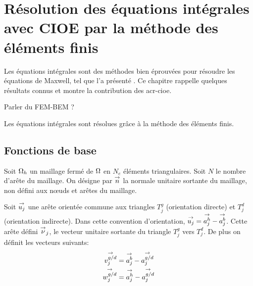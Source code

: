 \section{Résolution des équations intégrales avec CIOE par la méthode des éléments finis}

  \newcommand{\phij}{\vect{\phi_j}}
  \newcommand{\pj}{\vect{p_j}}
  \newcommand{\qj}{\vect{q_j}}
  \newcommand{\nuj}{\vect{\nu_j}}
  \newcommand{\uj}{\vect{u_j}}

  Les équations intégrales sont des méthodes bien éprouvées pour résoudre les équations de Maxwell, tel que l'a présenté \cite{nedelec_acoustic_2001}. Ce chapitre rappelle quelques résultats connus et montre la contribution des \gls{acr-cioe}.

  \begin{TODO}
    Parler du FEM-BEM ?
  \end{TODO}

  Les équations intégrales sont résolues grâce à la méthode des éléments finis.

  \subsection{Fonctions de base}

    Soit \(\Omega_h\) un maillage fermé de \(\Omega\) en \(N_e\) éléments triangulaires. Soit \(N\) le nombre d'arête du maillage. On désigne par \({\overset{\rightarrow}{n}}\) la normale unitaire sortante du maillage, non défini aux nœuds et arêtes du maillage.

    Soit \(\uj\) une arête orientée commune aux triangles \(T_j^g\) (orientation directe) et \(T_j^d\) (orientation indirecte). Dans cette convention d'orientation, \(\uj = \vect{a_j^h}-\vect{a_j^b}\). Cette arête défini \({\overset{\rightarrow}{\nu}}_j\), le vecteur unitaire sortante du triangle \(T_j^g\) vers \(T_j^d\).  De plus on définit les vecteurs suivants:
    \begin{align}
      {\overset{\rightarrow}{v_j^{g/d}}} &= {\overset{\rightarrow}{a_j^b}} - {\overset{\rightarrow}{a_j^{g/d}}} \\
      {\overset{\rightarrow}{w_j^{g/d}}} &= {\overset{\rightarrow}{a_j^h}} - {\overset{\rightarrow}{a_j^{g/d}}}
    \end{align}

    \newcommand{\ncouche}{6}
    \newcommand{\xa}{-0.2}
    \newcommand{\ya}{0.0}
    \newcommand{\xb}{3}
    \newcommand{\yb}{0.3}
    \newcommand{\xc}{0.4}
    \newcommand{\yc}{4}
    \newcommand{\xd}{4}
    \newcommand{\yd}{3.4}

